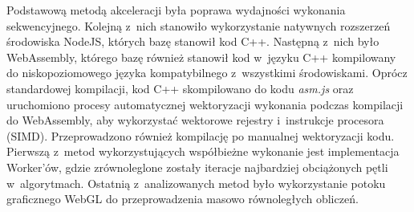Podstawową metodą akceleracji była poprawa wydajności wykonania sekwencyjnego. Kolejną z~nich stanowiło wykorzystanie natywnych rozszerzeń środowiska NodeJS, których bazę stanowił kod C++. Następną z~nich było WebAssembly, którego bazę również stanowił kod w~języku C++ kompilowany do niskopoziomowego języka kompatybilnego z~wszystkimi środowiskami. Oprócz standardowej kompilacji, kod C++ skompilowano do kodu \textit{asm.js} oraz uruchomiono procesy automatycznej wektoryzacji wykonania podczas kompilacji do WebAssembly, aby wykorzystać wektorowe rejestry i~instrukcje procesora (SIMD). Przeprowadzono również kompilację po manualnej wektoryzacji kodu. Pierwszą z~metod wykorzystujących współbieżne wykonanie jest implementacja Worker'ów, gdzie zrównoleglone zostały iteracje najbardziej obciążonych pętli w~algorytmach. Ostatnią z~analizowanych metod było wykorzystanie potoku graficznego WebGL do przeprowadzenia masowo równoległych obliczeń.

